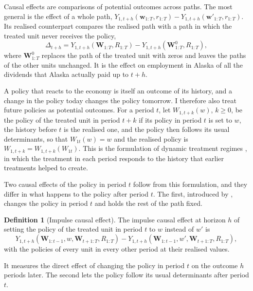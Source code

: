 \documentclass[12pt,a4paper]{article}
\theoremstyle{definition}
\theoremstyle{definition}\newtheorem{example}{Example}
\theoremstyle{definition}\newtheorem{definition}{Definition}
\begin{document}
Causal effects are comparisons of potential outcomes across paths. The most general is the effect of a whole path, $Y_{1,t+h}(\mathbf{w}_{1:T},r_{1:T})-Y_{1,t+h}(\mathbf{w}'_{1:T},r_{1:T})$. Its realised counterpart compares the realised path with a path in which the treated unit never receives the policy,
\begin{equation}
\Delta_{t+h}=Y_{1,t+h}(\mathbf{W}_{1:T},R_{1:T})-Y_{1,t+h}(\mathbf{W}^{0}_{1:T},R_{1:T}),
\label{eq:effectpath}
\end{equation}
where $\mathbf{W}^0_{1:T}$ replaces the path of the treated unit with zeros and leaves the paths of the other units unchanged. It is the effect on employment in Alaska of all the dividends that Alaska actually paid up to $t+h$.

A policy that reacts to the economy is itself an outcome of its history, and a change in the policy today changes the policy tomorrow. I therefore also treat future policies as potential outcomes. For a period $t$, let $W_{1,t+k}(w)$, $k\geq0$, be the policy of the treated unit in period $t+k$ if its policy in period $t$ is set to $w$, the history before $t$ is the realised one, and the policy then follows its usual determinants, so that $W_{1t}(w)=w$ and the realised policy is $W_{1,t+k}=W_{1,t+k}(W_{1t})$. This is the formulation of dynamic treatment regimes \citep{Robins1986,Murphy2003}, in which the treatment in each period responds to the history that earlier treatments helped to create.

Two causal effects of the policy in period $t$ follow from this formulation, and they differ in what happens to the policy after period $t$. The first, introduced by \citet{RambachanSheppard2021}, changes the policy in period $t$ and holds the rest of the path fixed.

\begin{definition}[Impulse causal effect\label{def:ice}]
The impulse causal effect at horizon $h$ of setting the policy of the treated unit in period $t$ to $w$ instead of $w'$ is
\begin{equation}
Y_{1,t+h}(\mathbf{W}_{1:t-1},w,\mathbf{W}_{t+1:T},R_{1:T})-Y_{1,t+h}(\mathbf{W}_{1:t-1},w',\mathbf{W}_{t+1:T},R_{1:T}),
\label{eq:ice}
\end{equation}
with the policies of every unit in every other period at their realised values.
\end{definition}

It measures the direct effect of changing the policy in period $t$ on the outcome $h$ periods later. The second lets the policy follow its usual determinants after period $t$.
\end{document}
